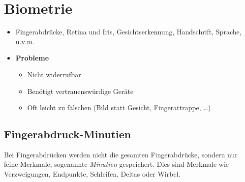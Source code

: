     \section{Biometrie}
        \begin{itemize}
        	\item Fingerabdrücke, Retina und Iris, Gesichtserkennung, Handschrift, Sprache, u.v.m.
        	\item \textbf{Probleme}
            	\begin{itemize}
            		\item Nicht widerrufbar
            		\item Benötigt vertrauenswürdige Geräte
            		\item Oft leicht zu fälschen (Bild statt Gesicht, Fingerattrappe, \dots)
            	\end{itemize}
        \end{itemize}

        \subsection{Fingerabdruck-Minutien}
            Bei Fingerabdrücken werden nicht die gesamten Fingerabdrücke, sondern nur feine Merkmale, sogenannte \textit{Minutien} gespeichert. Dies sind Merkmale wie Verzweigungen, Endpunkte, Schleifen, Deltas oder Wirbel.

